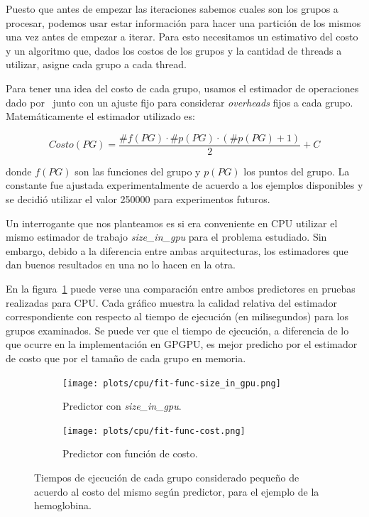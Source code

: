 Puesto que antes de empezar las iteraciones sabemos cuales son los grupos a
procesar, podemos usar estar informaci\'on para hacer una partici\'on de los mismos
una vez antes de empezar a iterar. Para esto necesitamos un estimativo del costo
y un algoritmo que, dados los costos de los grupos y la cantidad de threads a
utilizar, asigne cada grupo a cada thread.

Para tener una idea del costo de cada grupo, usamos el estimador de operaciones
dado por~\cite{LIO} junto con un ajuste fijo para considerar \textit{overheads} fijos a
cada grupo. Matem\'aticamente el estimador utilizado es:

\begin{equation}
    Costo(PG) = \frac{\#f(PG) \cdot \#p(PG) \cdot (\#p(PG) + 1)}{2} + C
\end{equation}

donde $f(PG)$ son las funciones del grupo y $p(PG)$ los puntos del grupo. La
constante fue ajustada experimentalmente de acuerdo a los ejemplos disponibles y
se decidi\'o utilizar el valor 250000 para experimentos futuros.

Un interrogante que nos planteamos es si era conveniente en CPU utilizar el mismo
estimador de trabajo \textit{size\_in\_gpu} para el problema estudiado. Sin
embargo, debido a la diferencia entre ambas arquitecturas, los estimadores que
dan buenos resultados en una no lo hacen en la otra.

En la figura~\ref{fig:comp-size-cost} puede verse una comparaci\'on entre ambos
predictores en pruebas realizadas para CPU. Cada gr\'afico muestra la calidad
relativa del estimador correspondiente con respecto al tiempo de ejecuci\'on
(en milisegundos) para los grupos examinados. Se puede ver que el tiempo de
ejecuci\'on, a diferencia de lo que ocurre en la implementaci\'on en GPGPU, es
mejor predicho por el estimador de costo que por el tama\~no de cada grupo en
memoria.

\begin{figure}[htbp]
   \centering
   \begin{subfigure}[b]{\plotwidthtres}
     \texttt{[image: plots/cpu/fit-func-size\_in\_gpu.png]}
     \caption{Predictor con \textit{size\_in\_gpu}.}
   \end{subfigure}
   \begin{subfigure}[b]{\plotwidthtres}
     \texttt{[image: plots/cpu/fit-func-cost.png]}
     \caption{Predictor con funci\'on de costo.}
   \end{subfigure}
   \caption{Tiempos de ejecuci\'on de cada grupo considerado peque\~no de acuerdo
    al costo del mismo seg\'un predictor, para el ejemplo de la hemoglobina.}
   \label{fig:comp-size-cost}
\end{figure}

